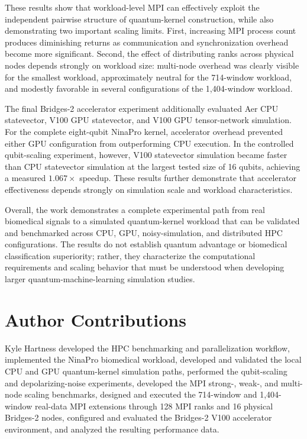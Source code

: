 \documentclass[pdflatex,sn-mathphys-num]{sn-jnl}%
\theoremstyle{thmstyleone}%
\theoremstyle{thmstyletwo}%
\theoremstyle{thmstylethree}%
\begin{document}
These results show that workload-level MPI can effectively exploit the
independent pairwise structure of quantum-kernel construction, while also
demonstrating two important scaling limits. First, increasing MPI process count
produces diminishing returns as communication and synchronization overhead
become more significant. Second, the effect of distributing ranks across
physical nodes depends strongly on workload size: multi-node overhead was
clearly visible for the smallest workload, approximately neutral for the
714-window workload, and modestly favorable in several configurations of the
1,404-window workload.

The final Bridges-2 accelerator experiment additionally evaluated Aer CPU
statevector, V100 GPU statevector, and V100 GPU tensor-network simulation.
For the complete eight-qubit NinaPro kernel, accelerator overhead prevented
either GPU configuration from outperforming CPU execution. In the controlled
qubit-scaling experiment, however, V100 statevector simulation became faster
than CPU statevector simulation at the largest tested size of 16 qubits,
achieving a measured \(1.067\times\) speedup. These results further demonstrate
that accelerator effectiveness depends strongly on simulation scale and
workload characteristics.

Overall, the work demonstrates a complete experimental path from real biomedical
signals to a simulated quantum-kernel workload that can be validated and
benchmarked across CPU, GPU, noisy-simulation, and distributed HPC
configurations. The results do not establish quantum advantage or biomedical
classification superiority; rather, they characterize the computational
requirements and scaling behavior that must be understood when developing
larger quantum-machine-learning simulation studies.

\section*{Author Contributions}

Kyle Hartness developed the HPC benchmarking and parallelization workflow,
implemented the NinaPro biomedical workload, developed and validated the local
CPU and GPU quantum-kernel simulation paths, performed the qubit-scaling and
depolarizing-noise experiments, developed the MPI strong-, weak-, and
multi-node scaling benchmarks, designed and executed the 714-window and
1,404-window real-data MPI extensions through 128 MPI ranks and 16 physical
Bridges-2 nodes, configured and evaluated the Bridges-2 V100 accelerator
environment, and analyzed the resulting performance data.
\end{document}
